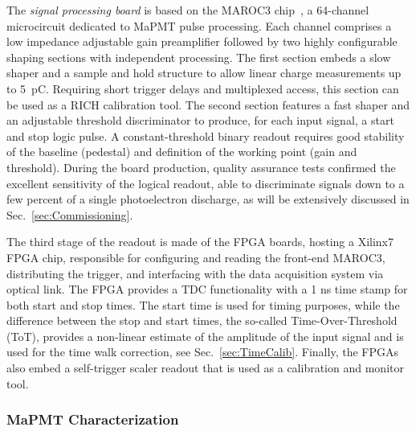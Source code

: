 \documentclass[5p,times,twocolumn]{elsarticle}
\begin{document}
The {\it signal processing board} is based on the MAROC3 chip~\cite{MAROC3:chip}, a 64-channel microcircuit
dedicated to MaPMT pulse processing. Each channel comprises a low impedance adjustable gain preamplifier followed
by two highly configurable shaping sections with independent processing. The first section embeds a slow shaper and
a sample and hold structure to allow linear charge measurements up to 5~pC. Requiring short trigger delays and
multiplexed access, this section can be used as a RICH calibration tool. The second section features a fast shaper and
an adjustable threshold discriminator to produce, for each input signal, a start and stop logic pulse. A constant-threshold
binary readout requires good stability of the baseline (pedestal) and definition of the working point (gain and
threshold). During the board production, quality assurance tests confirmed the excellent sensitivity of the logical
readout, able to discriminate signals down to a few percent of a single photoelectron discharge, as will be extensively
discussed in Sec.~\ref{sec:Commissioning}.

The third stage of the readout is made of the FPGA boards, hosting a Xilinx7 FPGA chip, responsible for configuring
and reading the front-end MAROC3, distributing the trigger, and interfacing with the data acquisition system
\cite{daq-nim} via optical link. The FPGA provides a TDC functionality with a 1 ns time stamp for both start and stop
times. The start time is used for timing purposes, while the difference between the stop and start times, the so-called
Time-Over-Threshold (ToT), provides a non-linear estimate of the amplitude of the input signal and is used for the time
walk correction, see Sec.~\ref{sec:TimeCalib}. Finally, the FPGAs also embed a self-trigger scaler readout that is used
as a calibration and monitor tool.

\subsubsection{MaPMT Characterization}
\label{sec:FEtests}
\end{document}
